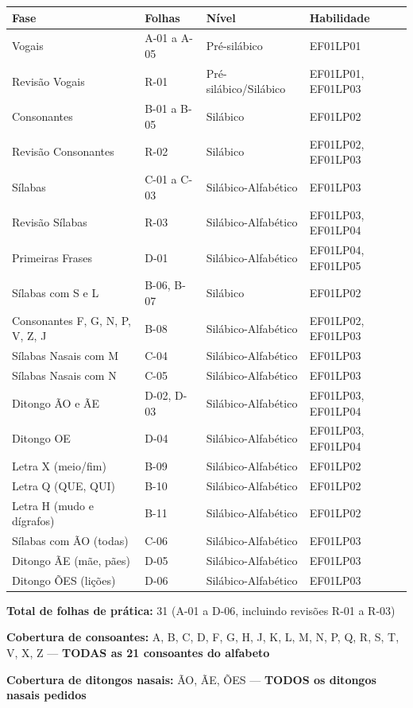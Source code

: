 \begin{center}
\begin{tabular}{|l|l|l|l|}
\hline
\textbf{Fase} & \textbf{Folhas} & \textbf{Nível} & \textbf{Habilidade} \\
\hline
Vogais & A-01 a A-05 & Pré-silábico & EF01LP01 \\
\hline
Revisão Vogais & R-01 & Pré-silábico/Silábico & EF01LP01, EF01LP03 \\
\hline
Consonantes & B-01 a B-05 & Silábico & EF01LP02 \\
\hline
Revisão Consonantes & R-02 & Silábico & EF01LP02, EF01LP03 \\
\hline
Sílabas & C-01 a C-03 & Silábico-Alfabético & EF01LP03 \\
\hline
Revisão Sílabas & R-03 & Silábico-Alfabético & EF01LP03, EF01LP04 \\
\hline
Primeiras Frases & D-01 & Silábico-Alfabético & EF01LP04, EF01LP05 \\
\hline
Sílabas com S e L & B-06, B-07 & Silábico & EF01LP02 \\
\hline
Consonantes F, G, N, P, V, Z, J & B-08 & Silábico-Alfabético & EF01LP02, EF01LP03 \\
\hline
Sílabas Nasais com M & C-04 & Silábico-Alfabético & EF01LP03 \\
\hline
Sílabas Nasais com N & C-05 & Silábico-Alfabético & EF01LP03 \\
\hline
Ditongo \~AO e \~AE & D-02, D-03 & Silábico-Alfabético & EF01LP03, EF01LP04 \\
\hline
Ditongo OE & D-04 & Silábico-Alfabético & EF01LP03, EF01LP04 \\
\hline
Letra X (meio/fim) & B-09 & Silábico-Alfabético & EF01LP02 \\
\hline
Letra Q (QUE, QUI) & B-10 & Silábico-Alfabético & EF01LP02 \\
\hline
Letra H (mudo e dígrafos) & B-11 & Silábico-Alfabético & EF01LP02 \\
\hline
Sílabas com ÃO (todas) & C-06 & Silábico-Alfabético & EF01LP03 \\
\hline
Ditongo ÃE (mãe, pães) & D-05 & Silábico-Alfabético & EF01LP03 \\
\hline
Ditongo ÕES (lições) & D-06 & Silábico-Alfabético & EF01LP03 \\
\hline
\end{tabular}
\end{center}

\vspace{1cm}
\noindent\textbf{Total de folhas de prática:} 31 (A-01 a D-06, incluindo revisões R-01 a R-03)

\noindent\textbf{Cobertura de consoantes:} A, B, C, D, F, G, H, J, K, L, M, N, P, Q, R, S, T, V, X, Z — \textbf{TODAS as 21 consoantes do alfabeto}

\noindent\textbf{Cobertura de ditongos nasais:} ÃO, ÃE, ÕES — \textbf{TODOS os ditongos nasais pedidos}
